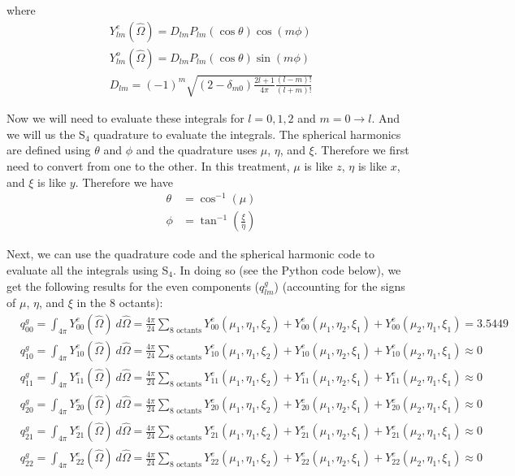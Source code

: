 \documentclass[10pt]{article}
\begin{document}
where
%
\begin{align*}
    Y_{lm}^e(\hat{\Omega}) = D_{lm}P_{lm}(\cos\theta)\cos(m\phi) \\
    Y_{lm}^o(\hat{\Omega}) = D_{lm}P_{lm}(\cos\theta)\sin(m\phi) \\
    D_{lm} = (-1)^m \sqrt{(2-\delta_{m0}) \frac{2l+1}{4\pi} \frac{(l-m)!}{(l+m)!}}
\end{align*}

Now we will need to evaluate these integrals for $l=0,1,2$ and $m=0\rightarrow l$. And we will us the S$_4$ quadrature to evaluate the integrals. The spherical harmonics are defined using $\theta$ and $\phi$ and the quadrature uses $\mu$, $\eta$, and $\xi$. Therefore we first need to convert from one to the other. In this treatment, $\mu$ is like $z$, $\eta$ is like $x$, and $\xi$ is like $y$. Therefore we have
\begin{align*}
    \theta &= \cos^{-1}(\mu) \\
    \phi &= \tan^{-1}\left(\frac{\xi}{\eta}\right)
\end{align*}


Next, we can use the quadrature code and the spherical harmonic code to evaluate all the integrals using S$_4$. In doing so (see the Python code below), we get the following results for the even components ($q_{lm}^g$) (accounting for the signs of $\mu$, $\eta$, and $\xi$ in the 8 octants):
%
\begin{align*}
  &q_{00}^g = \int_{4\pi}Y_{00}^e(\hat{\Omega})\:d\hat{\Omega} = \frac{4\pi}{24}\sum_{\textrm{8 octants}}Y_{00}^e(\mu_1,\eta_1,\xi_2) + Y_{00}^e(\mu_1,\eta_2,\xi_1) + Y_{00}^e(\mu_2,\eta_1,\xi_1) = 3.5449 \\
  &q_{10}^g =\int_{4\pi}Y_{10}^e(\hat{\Omega})\:d\hat{\Omega} = \frac{4\pi}{24}\sum_{\textrm{8 octants}}Y_{10}^e(\mu_1,\eta_1,\xi_2) + Y_{10}^e(\mu_1,\eta_2,\xi_1) + Y_{10}^e(\mu_2,\eta_1,\xi_1) \approx 0 \\
  &q_{11}^g =\int_{4\pi}Y_{11}^e(\hat{\Omega})\:d\hat{\Omega} = \frac{4\pi}{24}\sum_{\textrm{8 octants}}Y_{11}^e(\mu_1,\eta_1,\xi_2) + Y_{11}^e(\mu_1,\eta_2,\xi_1) + Y_{11}^e(\mu_2,\eta_1,\xi_1) \approx 0 \\
  &q_{20}^g =\int_{4\pi}Y_{20}^e(\hat{\Omega})\:d\hat{\Omega} = \frac{4\pi}{24}\sum_{\textrm{8 octants}}Y_{20}^e(\mu_1,\eta_1,\xi_2) + Y_{20}^e(\mu_1,\eta_2,\xi_1) + Y_{20}^e(\mu_2,\eta_1,\xi_1) \approx 0 \\
  &q_{21}^g =\int_{4\pi}Y_{21}^e(\hat{\Omega})\:d\hat{\Omega} = \frac{4\pi}{24}\sum_{\textrm{8 octants}}Y_{21}^e(\mu_1,\eta_1,\xi_2) + Y_{21}^e(\mu_1,\eta_2,\xi_1) + Y_{21}^e(\mu_2,\eta_1,\xi_1) \approx 0 \\
  &q_{22}^g =\int_{4\pi}Y_{22}^e(\hat{\Omega})\:d\hat{\Omega} = \frac{4\pi}{24}\sum_{\textrm{8 octants}}Y_{22}^e(\mu_1,\eta_1,\xi_2) + Y_{22}^e(\mu_1,\eta_2,\xi_1) + Y_{22}^e(\mu_2,\eta_1,\xi_1) \approx 0 \\
\end{align*}
\end{document}
